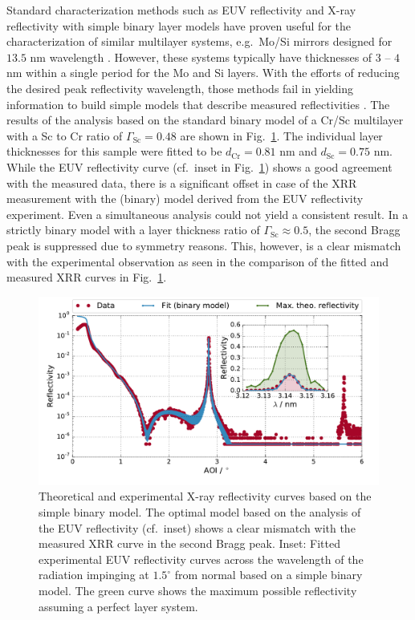 \documentclass{iucr}              %
\begin{document}
Standard characterization methods such as EUV reflectivity and X-ray reflectivity with simple binary layer models have proven useful for the characterization of similar multilayer systems, e.g.~Mo/Si mirrors designed for $13.5$ nm wavelength \cite{Lim2001, bajt_mosi_crstallization, braun_mosi_different_barrier_layers}. However, these systems typically have thicknesses of $3$ -- $4$ nm within a single period for the Mo and Si layers. With the efforts of reducing the desired peak reflectivity wavelength, those methods fail in yielding information to build simple models that describe measured reflectivities \cite{Yakunin:14}. The results of the analysis based on the standard binary model of a Cr/Sc multilayer with a Sc to Cr ratio of $\Gamma_\text{Sc}=0.48$ are shown in Fig.~\ref{fig:EUV_XRR_reflectivity}. The individual layer thicknesses for this sample were fitted to be $d_\text{Cr} = 0.81$ nm and $d_\text{Sc}= 0.75$ nm. While the EUV reflectivity curve (cf.~inset in Fig.~\ref{fig:EUV_XRR_reflectivity}) shows a good agreement with the measured data, there is a significant offset in case of the XRR measurement with the (binary) model derived from the EUV reflectivity experiment. Even a simultaneous analysis could not yield a consistent result. In a strictly binary model with a layer thickness ratio of $\Gamma_\text{Sc}\approx 0.5$, the second Bragg peak is suppressed due to symmetry reasons. This, however, is a clear mismatch with the experimental observation as seen in the comparison of the fitted and measured XRR curves in Fig.~\ref{fig:EUV_XRR_reflectivity}.
\begin{figure}
  \centering
  \includegraphics[width=\textwidth]{images/binary_model_and_theo_refl}
  \caption{Theoretical and experimental X-ray reflectivity curves based on the simple binary model. The optimal model based on the analysis of the EUV reflectivity (cf.~inset) shows a clear mismatch with the measured XRR curve in the second Bragg peak. Inset: Fitted experimental EUV reflectivity curves across the wavelength of the radiation impinging at $1.5^\circ$ from normal based on a simple binary model. The green curve shows the maximum possible reflectivity assuming a perfect layer system.
}
  \label{fig:EUV_XRR_reflectivity}
\end{figure}
\end{document}

